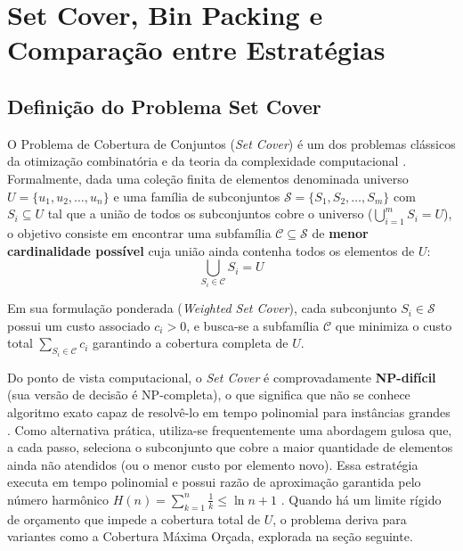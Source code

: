 
\chapter{Set Cover, Bin Packing e Comparação entre Estratégias}

\section{Definição do Problema Set Cover}

O Problema de Cobertura de Conjuntos (\textit{Set Cover}) é um dos problemas clássicos da otimização combinatória e da teoria da complexidade computacional \cite{cormen2012}. Formalmente, dada uma coleção finita de elementos denominada universo $U = \{u_1, u_2, \dots, u_n\}$ e uma família de subconjuntos $\mathcal{S} = \{S_1, S_2, \dots, S_m\}$ com $S_i \subseteq U$ tal que a união de todos os subconjuntos cobre o universo ($\bigcup_{i=1}^{m} S_i = U$), o objetivo consiste em encontrar uma subfamília $\mathcal{C} \subseteq \mathcal{S}$ de \textbf{menor cardinalidade possível} cuja união ainda contenha todos os elementos de $U$:
\begin{equation}
    \bigcup_{S_i \in \mathcal{C}} S_i = U
\end{equation}

Em sua formulação ponderada (\textit{Weighted Set Cover}), cada subconjunto $S_i \in \mathcal{S}$ possui um custo associado $c_i > 0$, e busca-se a subfamília $\mathcal{C}$ que minimiza o custo total $\sum_{S_i \in \mathcal{C}} c_i$ garantindo a cobertura completa de $U$.

Do ponto de vista computacional, o \textit{Set Cover} é comprovadamente \textbf{NP-difícil} (sua versão de decisão é NP-completa), o que significa que não se conhece algoritmo exato capaz de resolvê-lo em tempo polinomial para instâncias grandes \cite{cormen2012, ziviani2011}. Como alternativa prática, utiliza-se frequentemente uma abordagem gulosa que, a cada passo, seleciona o subconjunto que cobre a maior quantidade de elementos ainda não atendidos (ou o menor custo por elemento novo). Essa estratégia executa em tempo polinomial e possui razão de aproximação garantida pelo número harmônico $H(n) = \sum_{k=1}^{n} \frac{1}{k} \le \ln n + 1$ \cite{fernandes2021}. Quando há um limite rígido de orçamento que impede a cobertura total de $U$, o problema deriva para variantes como a Cobertura Máxima Orçada, explorada na seção seguinte.


